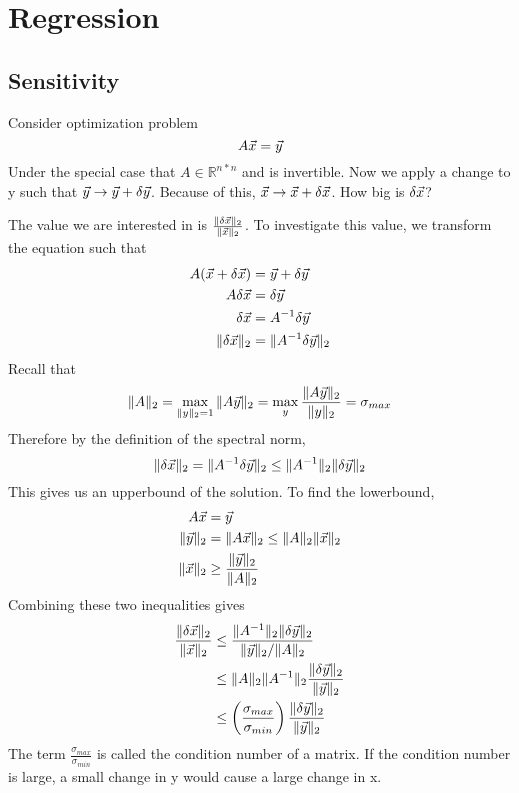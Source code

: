 \section{Regression} %
\label{sec:regression}

\subsection{Sensitivity} %
\label{sub:sensitivity}

\begin{definition}
	Consider optimization problem
	\[
A\vec{x} = \vec{y}
	\]
	Under the special case that $A\in\mathbb{R}^{n*n}$ and is invertible. Now we apply a change to y such that $\vec{y} \rightarrow \vec{y}+\delta\vec{y}$. Because of this, $\vec{x} \rightarrow \vec{x}+\delta\vec{x}$. How big is $\delta\vec{x}$?
\end{definition}

\begin{theorem}
	The value we are interested in is $\frac{\| \delta \vec{x}\|_2}{\|\vec{x}\|_2}$. To investigate this value, we transform the equation such that
	\begin{align*}
	A(\vec{x}+\delta\vec{x}) &= \vec{y}+\delta\vec{y}\\
		A \delta\vec{x} &= \delta\vec{y}\\
		\delta\vec{x}&=A^{-1}\delta\vec{y}\\
		\|\delta\vec{x}\|_2 &= \|A^{-1}\delta\vec{y}\|_2
	\end{align*}
	Recall that
	\[
\|A\|_2 = \max_{\|y\|_2=1}\|A\vec{y}\|_2 = \max_{y}\frac{\|A\vec{y}\|_2}{\|y\|_2} = \sigma_{max}
	\]
	Therefore by the definition of the spectral norm,
	\[
\|\delta\vec{x}\|_2 = \|A^{-1}\delta\vec{y}\|_2 \le \|A^{-1}\|_2\|\delta\vec{y}\|_2
	\]
	This gives us an upperbound of the solution. To find the lowerbound,
	\begin{align*}
		A\vec{x}&=\vec{y}\\
		\|\vec{y}\|_2 &= \|A\vec{x}\|_2 \le \|A\|_2\|\vec{x}\|_2\\
		\|\vec{x}\|_2 &\ge \frac{\|\vec{y}\|_2}{\|A\|_2}
	\end{align*}
	Combining these two inequalities gives
	\begin{align*}
		\frac{\| \delta\vec{x}\|_2}{\|\vec{x}\|_2} &\le \frac{\|A^{-1}\|_2\| \delta\vec{y}\|_2}{\|\vec{y}\|_2/\|A\|_2}\\ 
		&\le \|A\|_2\|A^{-1}\|_2 \frac{\| \delta\vec{y}\|_2}{\|\vec{y}\|_2}\\
		&\le \left(\frac{\sigma_{max}}{\sigma_{min}}\right)\frac{\| \delta\vec{y}\|_2}{\|\vec{y}\|_2}
	\end{align*}
	The term $\frac{\sigma_{max}}{\sigma_{min}}$ is called the condition number of a matrix. If the condition number is large, a small change in y would cause a large change in x.
\end{theorem}

